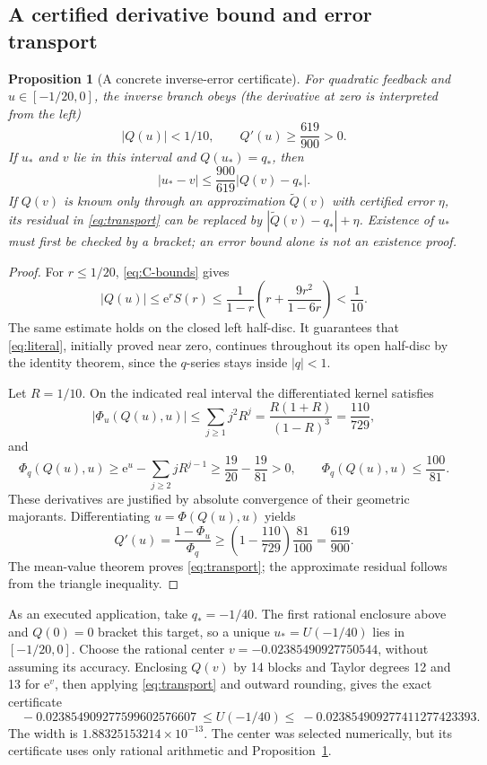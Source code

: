 \documentclass[11pt,a4paper]{article}
\numberwithin{equation}{section}
\newtheorem{proposition}[theorem]{Proposition}
\theoremstyle{definition}
\theoremstyle{remark}
\newcommand{\ee}{\mathrm e}
\begin{document}
\subsection{A certified derivative bound and error transport}
\begin{proposition}[A concrete inverse-error certificate]
\label{prop:errortransport}
For quadratic feedback and $u\in[-1/20,0]$, the inverse branch obeys
(the derivative at zero is interpreted from the left)
\begin{equation}
 |Q(u)|<1/10,\qquad Q'(u)\ge\frac{619}{900}>0.
 \label{eq:derivative}
\end{equation}
If $u_*$ and $v$ lie in this interval and $Q(u_*)=q_*$, then
\begin{equation}
 |u_*-v|\le\frac{900}{619}|Q(v)-q_*|.
 \label{eq:transport}
\end{equation}
If $Q(v)$ is known only through an approximation $\widetilde Q(v)$ with
certified error $\eta$, its residual in \eqref{eq:transport} can be replaced
by $|\widetilde Q(v)-q_*|+\eta$.  Existence of $u_*$ must first be checked
by a bracket; an error bound alone is not an existence proof.
\end{proposition}
\begin{proof}
For $r\le1/20$, \eqref{eq:C-bounds} gives
\[
 |Q(u)|\le\ee^r S(r)
 \le\frac1{1-r}\left(r+\frac{9r^2}{1-6r}\right)<\frac1{10}.
\]
The same estimate holds on the closed left half-disc.  It guarantees
that \eqref{eq:literal}, initially proved near zero, continues throughout
its open half-disc by the identity theorem, since the $q$-series stays
inside $|q|<1$.

Let $R=1/10$.  On the indicated real interval the differentiated kernel
satisfies
\[
 |\Phi_u(Q(u),u)|\le\sum_{j\ge1}j^2R^j
   =\frac{R(1+R)}{(1-R)^3}=\frac{110}{729},
\]
and
\[
 \Phi_q(Q(u),u)\ge\ee^u-\sum_{j\ge2}jR^{j-1}
 \ge\frac{19}{20}-\frac{19}{81}>0,
 \qquad \Phi_q(Q(u),u)\le\frac{100}{81}.
\]
These derivatives are justified by absolute convergence of their
geometric majorants.  Differentiating $u=\Phi(Q(u),u)$ yields
\[
 Q'(u)=\frac{1-\Phi_u}{\Phi_q}
 \ge\left(1-\frac{110}{729}\right)\frac{81}{100}
 =\frac{619}{900}.
\]
The mean-value theorem proves \eqref{eq:transport}; the approximate
residual follows from the triangle inequality.
\end{proof}

As an executed application, take $q_*=-1/40$.  The first rational
enclosure above and $Q(0)=0$ bracket this target, so a unique
$u_*=U(-1/40)$ lies in $[-1/20,0]$.  Choose the rational center
$v=-0.02385490927750544$, without assuming its accuracy.  Enclosing $Q(v)$
by 14 blocks and Taylor degrees 12 and 13 for $\ee^v$, then applying
\eqref{eq:transport} and outward rounding, gives the exact certificate
\begin{equation}
 \boxed{\quad
 -0.023854909277599602576607
 \ \le U(-1/40)\le\
 -0.023854909277411277423393.
 \quad}
 \label{eq:U-cert}
\end{equation}
The width is $1.88325153214\times10^{-13}$.
The center was selected numerically, but its certificate uses only rational
arithmetic and Proposition~\ref{prop:errortransport}.
\end{document}
